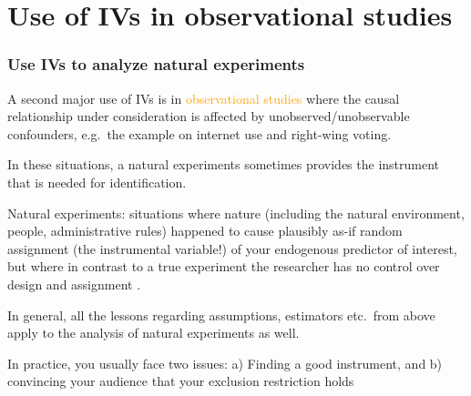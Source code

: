 \documentclass[12pt,english,dvipsnames,aspectratio=169,handout]{beamer}\usepackage[]{graphicx}\usepackage[]{xcolor}
\begin{document}
\section{Use of IVs in observational studies}

\begin{frame}
\frametitle{Use IVs to analyze natural experiments}
\footnotesize

A second major use of IVs is in \textcolor{orange}{observational studies} where the causal relationship under consideration is affected by unobserved/unobservable confounders, e.g.\ the example on internet use and right-wing voting.

In these situations, a natural experiments sometimes provides the instrument that is needed for identification.

\scriptsize{Natural experiments: situations where nature (including the natural environment, people, administrative rules) happened to cause plausibly as-if random assignment (the instrumental variable!) of your endogenous predictor of interest, but where in contrast to a true experiment the researcher has no control over design and assignment \cite[17]{dunning_natural_2012}.}

\footnotesize In general, all the lessons regarding assumptions, estimators etc.\ from above apply to the analysis of natural experiments as well.

In practice, you usually face two issues: a) Finding a good instrument, and b) convincing your audience that your exclusion restriction holds

\vspace{3cm}
\end{frame}
\end{document}
